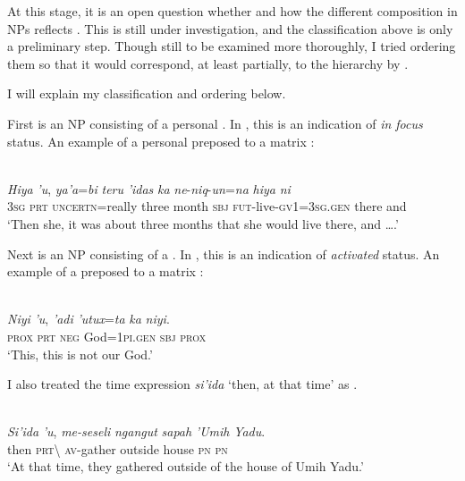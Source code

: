 \documentclass[output=paper
,modfonts
,nonflat]{langsci/langscibook}
\begin{document}
At this stage, it is an open question whether and how the different composition in  NPs reflects . This is still under investigation, and the classification above is only a preliminary step. Though still to be examined more thoroughly, I tried ordering them so that it would correspond, at least partially, to the  hierarchy by \citet{Gundel1993}. 

I will explain my classification and ordering below.

First is an NP consisting of a personal . In \citet{Gundel1993}, this is an indication of \textit{in focus} status. An example of a personal  preposed to a matrix :

\begin{exe}
	\label{e:tsukida:34}\\
	\gll \textit{Hiya}  \textit{'u},  \textit{ya'a}=\textit{bi}       \textit{teru} \textit{'idas}  \textit{ka}  \textit{ne}-\textit{niq}-\textit{un}=\textit{na}    \textit{hiya}   \textit{ni}\\
	\textsc{3sg} \textsc{prt} \textsc{uncertn}=really   three  month \textsc{sbj} \textsc{fut}-live-\textsc{gv1}=\textsc{3sg}.\textsc{gen} there  and\\
	\glt ‘Then she, it was about three months that she would live there, and ….’
\end{exe}

\noindent
Next is an NP consisting of a . In \citet{Gundel1993}, this is an indication of \textit{activated} status. An example of a  preposed to a matrix :

\begin{exe}
	\label{e:tsukida:35}\\
	\gll \textit{Niyi}  \textit{'u},   \textit{'adi}   \textit{'utux}=\textit{ta} \textit{ka} \textit{niyi}.\\
	\textsc{prox}   \textsc{prt}   \textsc{neg} God=\textsc{1pi.gen}  \textsc{sbj}  \textsc{prox}\\
	\glt ‘This, this is not our God.’
\end{exe}

\noindent
I also treated the time expression \textit{si'ida} ‘then, at that time’ as .

\begin{exe}
	\label{e:tsukida:36}\\
	\gll \textit{Si'ida} \textit{'u},   \textit{me-seseli}   \textit{ngangut}   \textit{sapah}   \textit{'Umih}   \textit{Yadu}.\\
	then \textsc{prt}{\textbackslash} \textsc{av}-gather outside house \textsc{pn} \textsc{pn}\\
	\glt ‘At that time, they gathered outside of the house of Umih Yadu.’
\end{exe}
\end{document}
